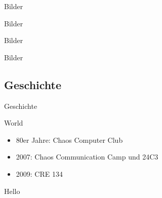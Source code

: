 \documentclass[hyperref={pdfpagelabels=false}]{beamer}
\begin{document}
\begin{frame}[label=secmatetags]{Bilder}
    \begin{figure}
    \end{figure}
\end{frame}

\begin{frame}[label=secpony]{Bilder}
    \begin{figure}
    \end{figure}
\end{frame}

\begin{frame}[label=secreprap]{Bilder}
    \begin{figure}
    \end{figure}
\end{frame}

\begin{frame}[label=secinvaders]{Bilder}
    \begin{figure}
    \end{figure}
\end{frame}

\subsection{Geschichte}

\begin{frame}[label=secgeschichte]{Geschichte}
    \begin{block}{World}
        \begin{itemize}
            \item 80er Jahre: Chaos Computer Club
            \item 2007: Chaos Communication Camp und 24C3
                \cite{Ohlig2007}
            \item 2009: CRE 134 \cite{Pritlove2009}
        \end{itemize}
    \end{block}
    \pause
    \begin{block}{Hello}
        \begin{center}
        \end{center}
    \end{block}
\end{frame}
\end{document}
